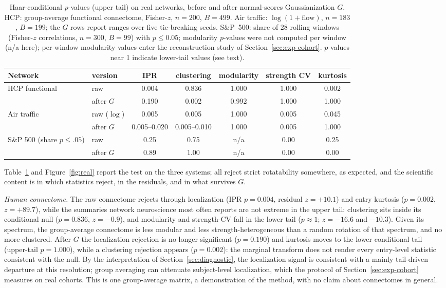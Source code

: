 \begin{table}[t]
\centering\small
\caption{Haar-conditional $p$-values (upper tail) on real networks,
before and after normal-scores Gaussianization $G$. HCP: group-average
functional connectome, Fisher-$z$, $n=200$, $B=499$. Air traffic:
$\log(1+\text{flow})$, $n=183$, $B=199$; the $G$ rows report ranges over
five tie-breaking seeds. S\&P~500: share of 28 rolling windows
(Fisher-$z$ correlations, $n=300$, $B=99$) with $p\le0.05$; modularity $p$-values were not computed per window (n/a here);
per-window modularity values enter the reconstruction study of
Section~\ref{sec:exp-cohort}. $p$-values near 1 indicate lower-tail
values (see text).}
\label{tab:real}
\begin{tabular}{llccccc}
\toprule
Network & version & IPR & clustering & modularity & strength CV & kurtosis\\
\midrule
HCP functional & raw & 0.004 & 0.836 & 1.000 & 1.000 & 0.002\\
 & after $G$ & 0.190 & 0.002 & 0.992 & 1.000 & 1.000\\
Air traffic & raw ($\log$) & 0.005 & 0.005 & 1.000 & 0.005 & 0.045\\
 & after $G$ & 0.005--0.020 & 0.005--0.010 & 1.000 & 0.005 & 1.000\\
S\&P 500 (share $p\le.05$) & raw & 0.25 & 0.75 & n/a & 0.00 & 0.25\\
 & after $G$ & 0.89 & 1.00 & n/a & 0.00 & 0.00\\
\bottomrule
\end{tabular}
\end{table}

Table~\ref{tab:real} and Figure~\ref{fig:real} report the test on
the three systems; all reject strict rotatability somewhere, as
expected, and the scientific content is in which statistics reject, in
the residuals, and in what survives $G$.

\emph{Human connectome.} The raw connectome rejects through localization
(IPR $p=0.004$, residual $z=+10.1$) and entry kurtosis ($p=0.002$,
$z=+89.7$), while the summaries network neuroscience most often reports
are not extreme in the upper tail: clustering sits inside its
conditional null ($p=0.836$, $z=-0.9$), and modularity and strength-CV
fall in the lower tail ($p\approx1$; $z=-16.6$ and $-10.3$). Given its
spectrum, the group-average connectome is less modular and less
strength-heterogeneous than a random rotation of that spectrum, and no
more clustered. After $G$ the localization rejection is no longer
significant ($p=0.190$) and kurtosis moves to the lower conditional tail
(upper-tail $p=1.000$), while a clustering
rejection appears ($p=0.002$): the marginal transform does not render every entry-level statistic consistent with the null. By the interpretation of Section~\ref{sec:diagnostic}, the localization
signal is consistent with a mainly tail-driven departure at this
resolution; group averaging can attenuate subject-level localization,
which the protocol of Section~\ref{sec:exp-cohort} measures on real
cohorts. This is one group-average matrix, a demonstration of the
method, with no claim about connectomes in general.

